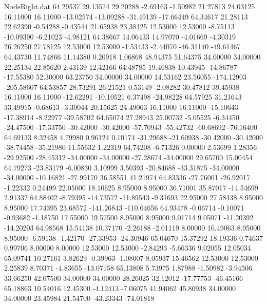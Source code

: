 \begin{filecontents}{NodeRight.dat}
  64.29537   29.13574   29.20288    -2.69163   -1.50982   21.27813   24.03125   16.11000   16.11000  -13.02574  -13.09288  -31.49139  -17.66449
  64.34617   21.28113   22.62390    -0.54288   -0.43544   21.65938   23.38125   12.53000   12.53000   -8.75113  -10.09390   -6.21023   -4.98121
  64.38667   14.06433   14.97070    -4.01669   -4.30319   26.26250   27.78125   12.53000   12.53000   -1.53433   -2.44070  -46.31140  -49.61467
  64.43730   11.74866   11.14380     0.20918    1.06868   48.94375   51.64375   34.00000   34.00000   22.25134   22.85620    2.43139   12.42166
  64.48785   19.46838   10.43945   -14.86787  -17.55380   52.30000   63.23750   34.00000   34.00000   14.53162   23.56055 -174.12903 -205.58607
  64.53857   28.73291   26.21521     0.53149   -2.08282   30.47812   39.45938   16.11000   16.11000  -12.62291  -10.10521    6.37498  -24.98228
  64.57925   31.21643   33.49915    -0.68613   -3.30044   20.15625   24.49063   16.11000   16.11000  -15.10643  -17.38914   -8.22977  -39.58702
  64.65074   27.28943   25.00732    -5.05525   -6.34450  -24.47500  -17.33750  -30.42000  -30.42000  -57.70943  -55.42732  -60.68692  -76.16400
  64.69133    8.32458    4.79980     0.96124    0.10174  -31.29688  -21.60938  -30.42000  -30.42000  -38.74458  -35.21980   11.55632    1.22319
  64.74208   -6.71326    0.00000     2.53699    1.28356  -29.92500  -28.45312  -34.00000  -34.00000  -27.28674  -34.00000   29.65700   15.00454
  64.79273  -23.83179   -6.00830     3.10999    3.50393  -20.84688  -33.31875  -34.00000  -34.00000  -10.16821  -27.99170   36.58551   41.21974
  64.83336  -27.76001  -26.92017    -1.22332    0.24499   22.05000   18.10625    8.95000    8.95000   36.71001   35.87017  -14.54699    2.91332
  64.88402   -8.79395  -14.73572   -11.89543   -9.31693   22.95000   27.58438    8.95000    8.95000   17.74395   23.68572 -141.26843 -110.64656
  64.93478   -0.06714   -0.10071    -0.93682   -1.18750   17.55000   19.57500    8.95000    8.95000    9.01714    9.05071  -11.20392  -14.20203
  64.98568   15.54138   10.37170    -2.26188   -2.01119    8.00000   10.49063    8.95000    8.95000   -6.59138   -1.42170  -27.33953  -24.30946
  65.04670   15.37292   18.19336     0.74637    0.99706    8.00000    8.00000   12.53000   12.53000   -2.84293   -5.66336    9.02055   12.05034
  65.09741   10.27161    3.82629    -0.39963   -1.08007    8.05937   15.46562   12.53000   12.53000    2.25839    8.70371   -4.83655  -13.07158
  65.13808    5.73975    1.87988    -1.50982   -3.94506   33.66250   42.07500   34.00000   34.00000   28.26025   32.12012  -17.77753  -46.45166
  65.18863   10.54016   12.45300    -4.12413   -7.06075   41.94062   45.80938   34.00000   34.00000   23.45984   21.54700  -43.23343  -74.01818

\end{filecontents}
